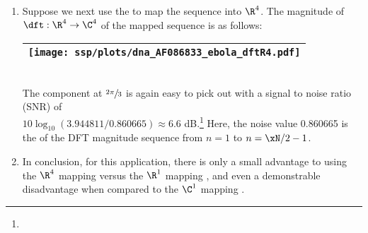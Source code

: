 \begin{example}
\begin{enumerate}
  \item \label{item:dftebola_R4}
    Suppose we next use the   to map
    the sequence into $\R^4$.
    The magnitude of $\dft:\R^4\to\C^4$ of the mapped sequence is as follows:
    \\\begin{tabular}{|>{\scs}c|}
         \hline
         \texttt{[image: ssp/plots/dna\_AF086833\_ebola\_dftR4.pdf]}%
       \\\hline
    \end{tabular}\\
    The component at $\sfrac{2\pi}{3}$ is again easy to pick out with a signal to noise ratio (SNR) of\\ 
    $10\log_{10}(3.944811/0.860665)\approx 6.6$ dB.\footnote{}
    Here, the noise value 0.860665 is the  of the DFT magnitude 
    sequence from $n=1$ to $n=\xN/2-1$.

  \item In conclusion, for this application, there is only a small advantage to using 
        the $\R^4$ mapping 
        versus the $\R^1$ mapping , 
        and even a demonstrable disadvantage when compared to the $\C^1$ mapping .
\end{enumerate}
\end{example}


